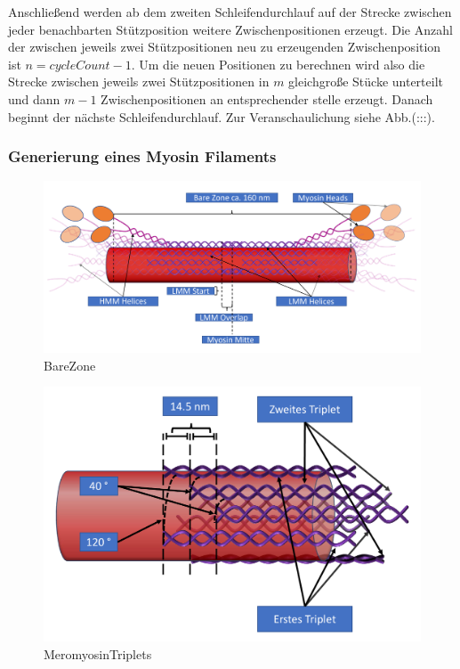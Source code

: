 \documentclass[a4paper,m]{cgBA}
\begin{document}
Anschließend werden ab dem zweiten Schleifendurchlauf auf der Strecke zwischen jeder benachbarten Stützposition weitere Zwischenpositionen erzeugt.
Die Anzahl der zwischen jeweils zwei Stützpositionen neu zu erzeugenden Zwischenposition ist \(n = cycleCount - 1\). Um die neuen Positionen zu berechnen wird also die Strecke zwischen jeweils zwei Stützpositionen in \(m\) gleichgroße Stücke unterteilt und dann \(m - 1\) Zwischenpositionen an entsprechender stelle erzeugt. Danach beginnt der nächste Schleifendurchlauf. Zur Veranschaulichung siehe Abb.(:::).

\subsubsection{Generierung eines Myosin Filaments}

\begin{figure}[!h]
\center
\includegraphics[width=1\textwidth]{Graphics/BareZone.pdf}
\caption{BareZone}
\label{fig:BareZone}
\end{figure}

\begin{figure}[h]
\center
\includegraphics[width=1\textwidth]{Graphics/MeromyosinTriplets.pdf}
\caption{MeromyosinTriplets}
\label{fig:MeromyosinTriplets}
\end{figure}
\end{document}
